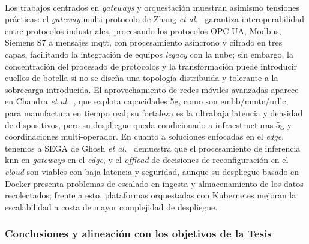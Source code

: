 \\
Los trabajos centrados en \textit{gateways} y orquestación muestran asimismo tensiones prácticas: el \textit{gateway} multi-protocolo de Zhang \textit{et al.}~\cite{zhang2020architecture} garantiza interoperabilidad entre protocolos industriales, procesando los protocolos OPC UA, Modbus, Siemens S7 a mensajes \gls{mqtt}, con procesamiento asíncrono y cifrado en tres capas, facilitando la integración de equipos \textit{legacy} con la nube; sin embargo, la concentración del procesado de protocolos y la transformación puede introducir cuellos de botella si no se diseña una topología distribuida y tolerante a la sobrecarga introducida. El aprovechamiento de redes móviles avanzadas aparece en Chandra \textit{et al.}~\cite{chandra20215g}, que explota capacidades \gls{5g}, como  son \gls{embb}/\gls{mmtc}/\gls{urllc}, para manufactura en tiempo real; su fortaleza es la ultrabaja latencia y densidad de dispositivos, pero su despliegue queda condicionado a infraestructuras \gls{5g} y coordinaciones multi-operador. En cuanto a soluciones enfocadas en el \textit{edge}, tenemos a SEGA de Ghosh \textit{et al.}~\cite{ghosh2021sega} demuestra que el procesamiento de inferencia \gls{knn} en \textit{gateways} en el \textit{edge}, y el \textit{offload} de decisiones de reconfiguración en el \textit{cloud} son viables con baja latencia y seguridad, aunque su despliegue basado en Docker presenta problemas de escalado en ingesta y almacenamiento de los datos recolectados; frente a esto, plataformas orquestadas con Kubernetes mejoran la escalabilidad a costa de mayor complejidad de despliegue.

\subsubsection{Conclusiones y alineación con los objetivos de la Tesis}


